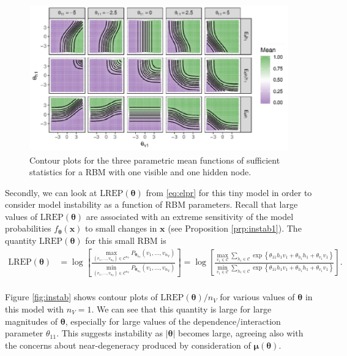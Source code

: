 \documentclass[AMS,STIX1COL]{WileyNJD-v2}
\newcommand{\nv}{{n_{\scriptscriptstyle V}}}
\begin{document}
\begin{figure}

{\centering \includegraphics{paper_files/figure-latex/degen-toy-1} 

}

\caption{\label{fig:degen-toy}Contour plots for the three parametric mean functions of sufficient statistics for a RBM with one visible and one hidden node.}\label{fig:degen-toy}
\end{figure}

Secondly, we can look at \(\text{LREP}(\boldsymbol \theta)\) from
\eqref{eq:elpr} for this tiny model in order to consider model
instability as a function of RBM parameters. Recall that large values of
\(\text{LREP}(\boldsymbol \theta)\) are associated with an extreme
sensitivity of the model probabilities
\(f_{\boldsymbol \theta}(\boldsymbol x)\) to small changes in
\(\boldsymbol x\) (see Proposition \ref{prp:instab1}). The quantity
\(\text{LREP}(\boldsymbol \theta)\) for this small RBM is \begin{align*}
\text{LREP}(\boldsymbol \theta) &= \log \left[\frac{\max\limits_{(v_1, \dots, v_\nv) \in \mathcal{C}^\nv}P_{\boldsymbol \theta_\nv}(v_1, \dots, v_\nv)}{\min\limits_{(v_1, \dots, v_\nv) \in \mathcal{C}^\nv}P_{\boldsymbol \theta_\nv}(v_1, \dots, v_\nv)}\right] = \log \left[\frac{\max\limits_{v_1 \in \mathcal{C}}\sum\limits_{h_1 \in \mathcal{C}}\exp\left\{\theta_{11} h_1 v_1 + \theta_{h_1}h_1 + \theta_{v_1} v_1 \right\}}{\min\limits_{v_1 \in \mathcal{C}}\sum\limits_{h_1 \in \mathcal{C}}\exp\left\{\theta_{11} h_1 v_1 + \theta_{h_1}h_1 + \theta_{v_1} v_1 \right\}}\right]. \\
\end{align*}

Figure \ref{fig:instab} shows contour plots of
\(\text{LREP}(\boldsymbol \theta)/\nv\) for various values of
\(\boldsymbol \theta\) in this model with \(\nv = 1\). We can see that
this quantity is large for large magnitudes of \(\boldsymbol \theta\),
especially for large values of the dependence/interaction parameter
\(\theta_{11}\). This suggests instability as \(|\boldsymbol \theta|\)
becomes large, agreeing also with the concerns about near-degeneracy
produced by consideration of \(\boldsymbol \mu(\boldsymbol \theta)\).
\end{document}
